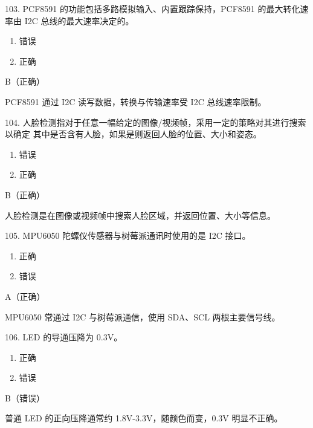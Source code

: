 \begin{question}{103. PCF8591 的功能包括多路模拟输入、内置跟踪保持，PCF8591 的最大转化速率由 I2C 总线的最大速率决定的。}
\begin{enumerate}[label=\Alph*., leftmargin=2.4em, itemsep=0.2em]
\item 错误
\item 正确
\end{enumerate}
\end{question}
\begin{answer}
B（正确）
\end{answer}
\begin{explanation}
PCF8591 通过 I2C 读写数据，转换与传输速率受 I2C 总线速率限制。
\end{explanation}

\begin{question}{104. 人脸检测指对于任意一幅给定的图像/视频帧，采用一定的策略对其进行搜索以确定 其中是否含有人脸，如果是则返回人脸的位置、大小和姿态。}
\begin{enumerate}[label=\Alph*., leftmargin=2.4em, itemsep=0.2em]
\item 错误
\item 正确
\end{enumerate}
\end{question}
\begin{answer}
B（正确）
\end{answer}
\begin{explanation}
人脸检测是在图像或视频帧中搜索人脸区域，并返回位置、大小等信息。
\end{explanation}

\begin{question}{105. MPU6050 陀螺仪传感器与树莓派通讯时使用的是 I2C 接口。}
\begin{enumerate}[label=\Alph*., leftmargin=2.4em, itemsep=0.2em]
\item 正确
\item 错误
\end{enumerate}
\end{question}
\begin{answer}
A（正确）
\end{answer}
\begin{explanation}
MPU6050 常通过 I2C 与树莓派通信，使用 SDA、SCL 两根主要信号线。
\end{explanation}

\begin{question}{106. LED 的导通压降为 0.3V。}
\begin{enumerate}[label=\Alph*., leftmargin=2.4em, itemsep=0.2em]
\item 正确
\item 错误
\end{enumerate}
\end{question}
\begin{answer}
B（错误）
\end{answer}
\begin{explanation}
普通 LED 的正向压降通常约 1.8V-3.3V，随颜色而变，0.3V 明显不正确。
\end{explanation}

